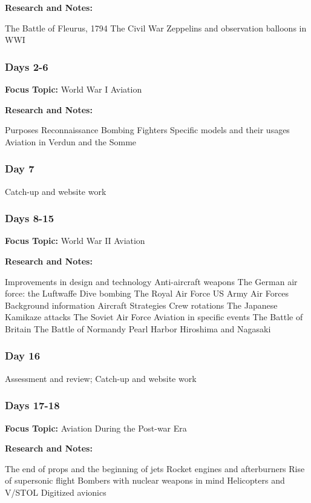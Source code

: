 \documentclass[12pt]{article}
\begin{document}
\textbf{Research and Notes:}
\begin{outline}
    \1 The Battle of Fleurus, 1794
\1 The Civil War
\1 Zeppelins and observation balloons in WWI
\end{outline}

\subsubsection{Days 2-6}
\textbf{Focus Topic:} World War I Aviation

\textbf{Research and Notes:}
\begin{outline}
    \1 Purposes
\2 Reconnaissance
\2 Bombing
\2 Fighters
\1 Specific models and their usages
\1 Aviation in Verdun and the Somme
\end{outline}
\subsubsection{Day 7}
Catch-up and website work
\subsubsection{Days 8-15}
\textbf{Focus Topic:} World War II Aviation

\textbf{Research and Notes:}
\begin{outline}
    \1 Improvements in design and technology
\1 Anti-aircraft weapons
\1 The German air force: the Luftwaffe
\2 Dive bombing
\1 The Royal Air Force
\1 US Army Air Forces
\2 Background information
\2 Aircraft
\2 Strategies
\2 Crew rotations
\1 The Japanese
\2 Kamikaze attacks
\1 The Soviet Air Force
\1 Aviation in specific events
\2 The Battle of Britain
\2 The Battle of Normandy
\2 Pearl Harbor
\2 Hiroshima and Nagasaki
\end{outline}
\subsubsection{Day 16}
Assessment and review; Catch-up and website work
\subsubsection{Days 17-18}
\textbf{Focus Topic:} Aviation During the Post-war Era

\textbf{Research and Notes:}
\begin{outline}
    \1 The end of props and the beginning of jets
\1 Rocket engines and afterburners
\1 Rise of supersonic flight
\1 Bombers with nuclear weapons in mind
\1 Helicopters and V/STOL
\1 Digitized avionics
\end{outline}
\end{document}
